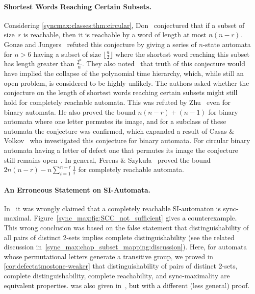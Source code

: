 
\paragraph{Shortest Words Reaching Certain Subsets.} Considering \cref{syncmax:classes:thm:circular}, 
Don~\cite[Conj.~18]{Don16} conjectured
that if a subset of size~$r$ is reachable, then it is reachable by a word of length
at most $n(n - r)$.
Gonze and Jungers~\cite[Prop.~7]{DBLP:journals/jalc/GonzeJ19} refuted this conjecture
by giving a series of $n$-state automata for $n > 6$ having a subset of size
$\lfloor \frac{n}{2} \rfloor$ where the shortest word reaching this subset
has length greater than $\frac{2^n}{n}$. They also noted~\cite[Sect.~2.3]{DBLP:journals/jalc/GonzeJ19}
that truth of this conjecture would have implied the collapse of the polynomial time hierarchy,
which, while still an open problem, is considered to be highly unlikely.
The authors asked whether the conjecture on the length of shortest words
reaching certain subsets might still hold for completely reachable automata.
This was refuted by Zhu~\cite{DBLP:conf/dlt/Zhu24} even for binary automata.
He also proved the bound $n(n-r) + (n-1)$ for binary automata where one letter permutes
its image, and for a subclass of these automata the conjecture was confirmed,
which expanded a result of Casas \& Volkov~\cite{CasasVolkov2024Don} who investigated
this conjecture for binary automata. For circular binary automata having
a letter of defect one that permutes its image the conjecture still remains open~\cite{CasasVolkov2024Don}.
In general, Ferens \& Szyku{\l}a~\cite{FerensSzykula2026} 
proved the bound $2n(n - r) - n \sum_{i=1}^{n - r} \frac{1}{i}$
for completely reachable automata. 

\paragraph{An Erroneous Statement on SI-Automata.} 
In~\cite[Thm.~12]{DBLP:conf/dcfs/Hoffmann22} it was wrongly claimed that a completely reachable SI-automaton is sync-maximal. Figure~\ref{sync_max:fig:SCC_not_sufficient} gives a counterexample.
This wrong conclusion was based on the false statement that
distinguishability of all pairs of distinct $2$-sets
implies complete distinguishability (see the related discussion in~\cref{sync_max:chap_subset_mapping:discussion}).
Here, for automata whose permutational letters generate a transitive group, we proved in \cref{cor:defectatmostone-weaker}
that distinguishability of pairs of distinct $2$-sets, complete distinguishability,
complete reachability, and sync-maximality are equivalent properties.
 was also given in~\cite[Lem.~11]{DBLP:conf/dcfs/Hoffmann22}, 
but with  a different (less general) proof.